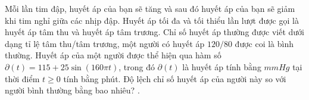 \begin{ex}%
Mỗi lần tim đập, huyết áp của bạn sẽ tăng và sau đó huyết áp của bạn sẽ giảm khi tim nghỉ giữa các nhịp đập. Huyết áp tối đa và tối thiểu lần lượt được gọi là huyết áp tâm thu và huyết áp tâm trương. Chỉ số huyết áp thường được viết dưới dạng tỉ lệ tâm thu/tâm trương, một người có huyết áp $120 / 80$ được coi là bình thường. Huyết áp của một người được thể hiện qua hàm số $\partial(t)=115+25 \sin (160 \pi t)$, trong đó $\partial(t)$ là huyết áp tính bằng $m m H g$ tại thời điểm $t \geq 0$ tính bằng phút. Độ lệch chỉ số huyết áp của người này so với người bình thường bằng bao nhiêu? .
\end{ex}








